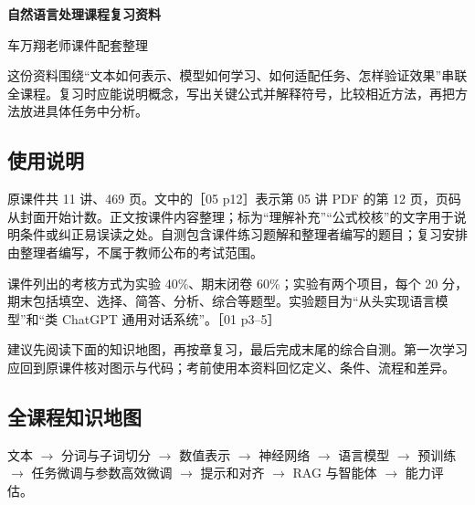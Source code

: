 \documentclass[UTF8,a4paper,zihao=-4,fontset=windows]{ctexart}
\begin{document}
{\LARGE\bfseries 自然语言处理课程复习资料\par}\vspace{4pt}
车万翔老师课件配套整理

这份资料围绕“文本如何表示、模型如何学习、如何适配任务、怎样验证效果”串联全课程。复习时应能说明概念，写出关键公式并解释符号，比较相近方法，再把方法放进具体任务中分析。

\subsection*{使用说明}
原课件共 11 讲、469 页。文中的［05 p12］表示第 05 讲 PDF 的第 12 页，页码从封面开始计数。正文按课件内容整理；标为“理解补充”“公式校核”的文字用于说明条件或纠正易误读之处。自测包含课件练习题解和整理者编写的题目；复习安排由整理者编写，不属于教师公布的考试范围。

课件列出的考核方式为实验 40\%、期末闭卷 60\%；实验有两个项目，每个 20 分，期末包括填空、选择、简答、分析、综合等题型。实验题目为“从头实现语言模型”和“类 ChatGPT 通用对话系统”。［01 p3--5］

建议先阅读下面的知识地图，再按章复习，最后完成末尾的综合自测。第一次学习应回到原课件核对图示与代码；考前使用本资料回忆定义、条件、流程和差异。

\subsection*{全课程知识地图}
文本 \ensuremath{\rightarrow} 分词与子词切分 \ensuremath{\rightarrow} 数值表示 \ensuremath{\rightarrow} 神经网络 \ensuremath{\rightarrow} 语言模型 \ensuremath{\rightarrow} 预训练 \ensuremath{\rightarrow} 任务微调与参数高效微调 \ensuremath{\rightarrow} 提示和对齐 \ensuremath{\rightarrow} RAG 与智能体 \ensuremath{\rightarrow} 能力评估。
\end{document}
